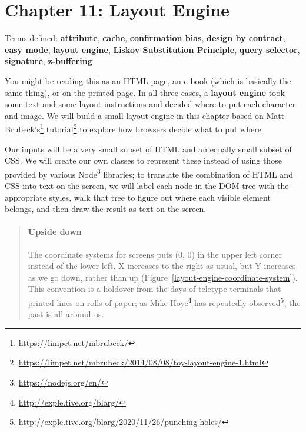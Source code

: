 \documentclass[krantzl]{krantz}
\newcommand{\figref}[1]{Figure~\ref{#1}}
\newcommand{\glossref}[1]{\textbf{#1}}
\newenvironment{callout}{\savenotes\begin{tBox}\begin{quotation}\toggletrue{inbox}\renewcommand{\thempfootnote}{\arabic{footnote}}}{\end{quotation}\vspace{\baselineskip}\end{tBox}\togglefalse{inbox}\spewnotes}
\newcommand{\hreffoot}[2]{{#1}\footnote{\href{#2}{#2}}}
\begin{document}
\chapter{Chapter 11: Layout Engine}\label{layout-engine}


\noindent 
    Terms defined:
    \glossref{attribute}, \glossref{cache}, \glossref{confirmation bias}, \glossref{design by contract}, \glossref{easy mode}, \glossref{layout engine}, \glossref{Liskov Substitution Principle}, \glossref{query selector}, \glossref{signature}, \glossref{z-buffering}



You might be reading this as an HTML page,
an e-book (which is basically the same thing),
or on the printed page.
In all three cases,
a \glossref{layout engine} took some text and some layout instructions
and decided where to put each character and image.
We will build a small layout engine in this chapter
based on \hreffoot{Matt Brubeck's}{https://limpet.net/mbrubeck/} \hreffoot{tutorial}{https://limpet.net/mbrubeck/2014/08/08/toy-layout-engine-1.html}
to explore how browsers decide what to put where.


Our inputs will be a very small subset of HTML and an equally small subset of CSS.
We will create our own classes to represent these
instead of using those provided by various \hreffoot{Node}{https://nodejs.org/en/} libraries;
to translate the combination of HTML and CSS into text on the screen,
we will label each node in the DOM tree with the appropriate styles,
walk that tree to figure out where each visible element belongs,
and then draw the result as text on the screen.

\begin{callout}


\subsubsection*{Upside down}


The coordinate systems for screens
puts (0, 0) in the upper left corner instead of the lower left.
X increases to the right as usual,
but Y increases as we go down, rather than up
(\figref{layout-engine-coordinate-system}).
This convention is a holdover from the days of teletype terminals
that printed lines on rolls of paper;
as \hreffoot{Mike Hoye}{http://exple.tive.org/blarg/} has \hreffoot{repeatedly observed}{http://exple.tive.org/blarg/2020/11/26/punching-holes/},
the past is all around us.

\end{callout}
\end{document}

